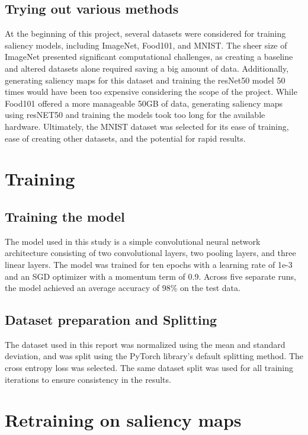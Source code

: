 \documentclass[conference]{IEEEtran}
\begin{document}
\subsection{Trying out various methods}

At the beginning of this project, several datasets were considered for training saliency models, including ImageNet, Food101, and MNIST. The sheer size of ImageNet\cite{ImageNet} presented significant computational challenges, as creating a baseline and altered datasets alone required saving a big amount of data. Additionally, generating saliency maps for this dataset and training the resNet50 model 50 times would have been too expensive considering the scope of the project.
 While Food101 offered a more manageable 50GB of data, generating saliency maps using resNET50\cite{ResNet50} and training the models took too long for the available hardware. Ultimately, the MNIST dataset\cite{MNIST} was selected for its ease of training, ease of creating other datasets, and the potential for rapid results.

\section{Training}

\subsection{Training the model}
The model used in this study is a simple convolutional neural network architecture consisting of two convolutional layers, two pooling layers, and three linear layers. The model was trained for ten epochs with a learning rate of 1e-3 and an SGD optimizer with a momentum term of 0.9. Across five separate runs, the model achieved an average accuracy of 98\% on the test data.

\subsection{Dataset preparation and Splitting}\label{AA}
The dataset used in this report was normalized using the mean and standard deviation, and was split using the PyTorch library's default splitting method. The cross entropy loss was selected. The same dataset split was used for all training iterations to ensure consistency in the results.

\section{Retraining on saliency maps}
\end{document}

